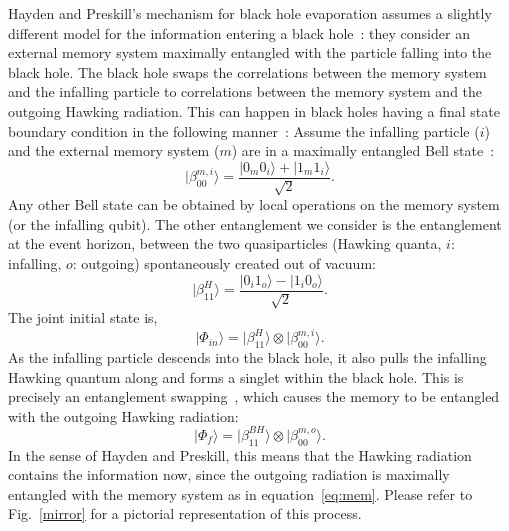 \documentclass[10pt,letterpaper,aps,onecolumn,superscriptaddress,floatfix,notitlepage]{revtex4-1}
\begin{document}
	Hayden and Preskill's mechanism for black hole evaporation assumes a slightly different model for the information entering a black hole~\cite{preskill,projection}: they consider an external memory system maximally entangled with the particle falling into the black hole. The black hole swaps the correlations between the memory system and the infalling particle to correlations between the memory system and the  outgoing Hawking radiation. This can happen in black holes having a final state boundary condition in the following manner~\cite{projection}: Assume the infalling particle ($i$) and the external memory system ($m$) are in a maximally entangled Bell state~\cite{niels}:
	\begin{equation}
	\label{eq:mem}
	|\beta^{m,i}_{00}\rangle =\frac{|0_{m}0_{i}\rangle+|1_{m}1_{i}\rangle}{\sqrt{2}}. 
	\end{equation}
	Any other Bell state can be obtained by local operations on the memory system (or the infalling qubit). The other entanglement we consider is the entanglement at the event horizon, between the two quasiparticles (Hawking quanta, $i$: infalling, $o$: outgoing) spontaneously created out of vacuum:
	\begin{equation}
	|\beta^{H}_{11}\rangle =\frac{|0_{i}1_{o}\rangle-|1_{i}0_{o}\rangle}{\sqrt{2}}. 
	\end{equation}	
	The joint initial state is,
	\begin{equation}
	|\Phi_{in}\rangle = |\beta^{H}_{11}\rangle\otimes|\beta^{m,i}_{00}\rangle.
	\end{equation}
	As the infalling particle descends into the black hole, it also pulls the infalling Hawking quantum along and forms a singlet within the black hole. This is precisely an entanglement swapping~\cite{zukowski1993event}, which causes the memory to be entangled with the outgoing Hawking radiation:
	\begin{equation}
	|\Phi_{f}\rangle = |\beta^{BH}_{11}\rangle\otimes|\beta^{m,o}_{00}\rangle.
	\end{equation}
	In the sense of Hayden and Preskill, this means that the Hawking radiation contains the information now, since the outgoing radiation is maximally entangled with the memory system as in equation~\eqref{eq:mem}. Please refer to Fig.~\ref{mirror} for a pictorial representation of this process.
	
\end{document}
